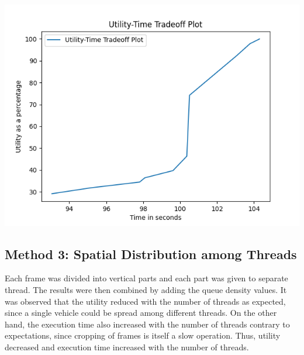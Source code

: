 \documentclass{article} %
\begin{document}
\begin{center}
    \\\includegraphics[scale = 0.9]{out_images/method_2_utility.png}
\end{center}

\subsection{Method 3: Spatial Distribution among Threads}
Each frame was divided into vertical parts and each part was given to separate thread. The results were then combined by adding the queue density values. It was observed that the utility reduced with the number of threads as expected, since a single vehicle could be spread among different threads. On the other hand, the execution time also increased with the number of threads contrary to expectations, since cropping of frames is itself a slow operation. Thus, utility decreased and execution time increased with the number of threads.
\end{document}
